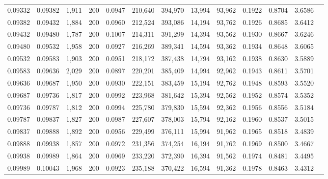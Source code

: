 \begin{tabular}{rrrrrrrrrrrrr}
0.09332 & 0.09382 & 1,911 & 200 &                                     0.0947 & 210,640 & 394,970 &  13,994 &  93,962 & 0.1922 & 0.8704 & 3.6586 \\
0.09382 & 0.09432 & 1,884 & 200 &                                     0.0960 & 212,524 & 393,086 &  14,194 &  93,762 & 0.1926 & 0.8685 & 3.6412 \\
0.09432 & 0.09480 & 1,787 & 200 &                                     0.1007 & 214,311 & 391,299 &  14,394 &  93,562 & 0.1930 & 0.8667 & 3.6246 \\
0.09480 & 0.09532 & 1,958 & 200 &                                     0.0927 & 216,269 & 389,341 &  14,594 &  93,362 & 0.1934 & 0.8648 & 3.6065 \\
0.09532 & 0.09583 & 1,903 & 200 &                                     0.0951 & 218,172 & 387,438 &  14,794 &  93,162 & 0.1938 & 0.8630 & 3.5889 \\
0.09583 & 0.09636 & 2,029 & 200 &                                     0.0897 & 220,201 & 385,409 &  14,994 &  92,962 & 0.1943 & 0.8611 & 3.5701 \\
0.09636 & 0.09687 & 1,950 & 200 &                                     0.0930 & 222,151 & 383,459 &  15,194 &  92,762 & 0.1948 & 0.8593 & 3.5520 \\
0.09687 & 0.09736 & 1,817 & 200 &                                     0.0992 & 223,968 & 381,642 &  15,394 &  92,562 & 0.1952 & 0.8574 & 3.5352 \\
0.09736 & 0.09787 & 1,812 & 200 &                                     0.0994 & 225,780 & 379,830 &  15,594 &  92,362 & 0.1956 & 0.8556 & 3.5184 \\
0.09787 & 0.09837 & 1,827 & 200 &                                     0.0987 & 227,607 & 378,003 &  15,794 &  92,162 & 0.1960 & 0.8537 & 3.5015 \\
0.09837 & 0.09888 & 1,892 & 200 &                                     0.0956 & 229,499 & 376,111 &  15,994 &  91,962 & 0.1965 & 0.8518 & 3.4839 \\
0.09888 & 0.09938 & 1,857 & 200 &                                     0.0972 & 231,356 & 374,254 &  16,194 &  91,762 & 0.1969 & 0.8500 & 3.4667 \\
0.09938 & 0.09989 & 1,864 & 200 &                                     0.0969 & 233,220 & 372,390 &  16,394 &  91,562 & 0.1974 & 0.8481 & 3.4495 \\
0.09989 & 0.10043 & 1,968 & 200 &                                     0.0923 & 235,188 & 370,422 &  16,594 &  91,362 & 0.1978 & 0.8463 & 3.4312 \\

\end{tabular}
